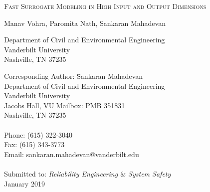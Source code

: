 \begin{center}
\textsc{Fast Surrogate Modeling in High Input and Output Dimensions}

\bigskip 
\bigskip 

Manav Vohra, Paromita Nath, Sankaran Mahadevan

\bigskip
\bigskip

\normalsize
Department of Civil and Environmental Engineering\\
Vanderbilt University\\
Nashville, TN 37235\\

\bigskip

\end{center}

\vspace{6cm}

\begin{tabbing}
Corresponding Author: \hspace{5mm} \= Sankaran Mahadevan\\
       \>  Department of Civil and Environmental Engineering\\
       \>  Vanderbilt University\\
        Jacobs Hall, VU Mailbox: PMB 351831 \\
       \>  Nashville, TN 37235 \\
       \> \\
Phone: \> (615) 322-3040 \\
Fax:   \> (615) 343-3773 \\
Email: \>  sankaran.mahadevan@vanderbilt.edu   \\
\\
Submitted to: \> \textit{Reliability Engineering $\&$ System Safety} \\
\>  January 2019\\

\bigskip
\end{tabbing}

\clearpage

